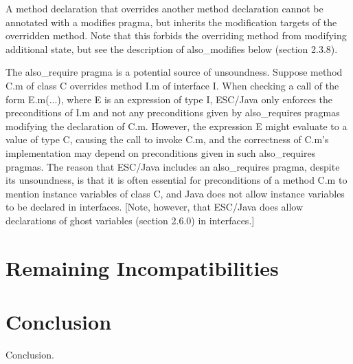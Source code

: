 \documentclass{acm_proc_article-sp}[10pt]
\begin{document}
A method declaration that overrides another method declaration cannot
be annotated with a modifies pragma, but inherits the modification
targets of the overridden method.  Note that this forbids the
overriding method from modifying additional state, but see the
description of also\_modifies below (section 2.3.8).

The also\_require pragma is a potential source of unsoundness.  Suppose
method C.m of class C overrides method I.m of interface I.  When
checking a call of the form E.m(...), where E is an expression of type
I, ESC/Java only enforces the preconditions of I.m and not any
preconditions given by also\_requires pragmas modifying the declaration
of C.m.  However, the expression E might evaluate to a value of type
C, causing the call to invoke C.m, and the correctness of C.m's
implementation may depend on preconditions given in such also\_requires
pragmas.  The reason that ESC/Java includes an also\_requires pragma,
despite its unsoundness, is that it is often essential for
preconditions of a method C.m to mention instance variables of class
C, and Java does not allow instance variables to be declared in
interfaces.  [Note, however, that ESC/Java does allow declarations of
ghost variables (section 2.6.0) in interfaces.]

\section{Remaining Incompatibilities}

\section{Conclusion} %

Conclusion.




%
\end{document}
